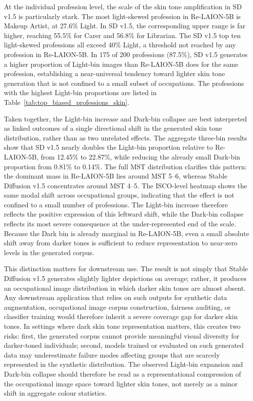 At the individual profession level, the scale of the skin tone amplification in SD v1.5 is particularly stark. The most light-skewed profession in Re-LAION-5B is Makeup Artist, at 27.6\% Light. In SD v1.5, the corresponding upper range is far higher, reaching 55.5\% for Carer and 56.8\% for Librarian. The SD v1.5 top ten light-skewed professions all exceed 40\% Light, a threshold not reached by any profession in Re-LAION-5B. In 175 of 200 professions (87.5\%), SD v1.5 generates a higher proportion of Light-bin images than Re-LAION-5B does for the same profession, establishing a near-universal tendency toward lighter skin tone generation that is not confined to a small subset of occupations. The professions with the highest Light-bin proportions are listed in Table~\ref{tab:top_biased_professions_skin}.

Taken together, the Light-bin increase and Dark-bin collapse are best interpreted as linked outcomes of a single directional shift in the generated skin tone distribution, rather than as two unrelated effects. The aggregate three-bin results show that SD v1.5 nearly doubles the Light-bin proportion relative to Re-LAION-5B, from 12.45\% to 22.87\%, while reducing the already small Dark-bin proportion from 0.81\% to 0.14\%. The full MST distribution clarifies this pattern: the dominant mass in Re-LAION-5B lies around MST 5--6, whereas Stable Diffusion v1.5 concentrates around MST 4--5. The ISCO-level heatmap shows the same modal shift across occupational groups, indicating that the effect is not confined to a small number of professions. The Light-bin increase therefore reflects the positive expression of this leftward shift, while the Dark-bin collapse reflects its most severe consequence at the under-represented end of the scale. Because the Dark bin is already marginal in Re-LAION-5B, even a small absolute shift away from darker tones is sufficient to reduce representation to near-zero levels in the generated corpus.

This distinction matters for downstream use. The result is not simply that Stable Diffusion v1.5 generates slightly lighter depictions on average; rather, it produces an occupational image distribution in which darker skin tones are almost absent. Any downstream application that relies on such outputs for synthetic data augmentation, occupational image corpus construction, fairness auditing, or classifier training would therefore inherit a severe coverage gap for darker skin tones. In settings where dark skin tone representation matters, this creates two risks: first, the generated corpus cannot provide meaningful visual diversity for darker-toned individuals; second, models trained or evaluated on such generated data may underestimate failure modes affecting groups that are scarcely represented in the synthetic distribution. The observed Light-bin expansion and Dark-bin collapse should therefore be read as a representational compression of the occupational image space toward lighter skin tones, not merely as a minor shift in aggregate colour statistics.


